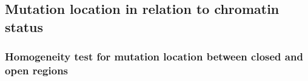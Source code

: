 \subsection{Mutation location in relation to chromatin status}\label{methods:chromatin}



\subsubsection{Homogeneity test for mutation location between closed and open regions}



